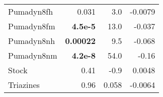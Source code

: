 \begin{tabular}{lrrr}
	Pumadyn8fh                                & 0.031                          & 3.0                           & -0.0079                              \\
	Pumadyn8fm                                & \textbf{4.5e-5}                & 13.0                          & -0.037                               \\
	Pumadyn8nh                                & \textbf{0.00022}               & 9.5                           & -0.068                               \\
	Pumadyn8nm                                & \textbf{4.2e-8}                & 54.0                          & -0.16                                \\
	\addlinespace
	Stock                                     & 0.41                           & -0.9                          & 0.0048                               \\
	Triazines                                 & 0.96                           & 0.058                         & -0.0064                              \\\bottomrule
\end{tabular}
